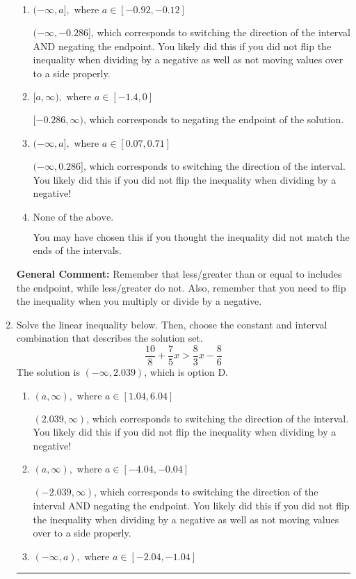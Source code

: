 \documentclass{extbook}[14pt]
\newcommand{\litem}[1]{\item #1

\rule{\textwidth}{0.4pt}}
\begin{document}
\begin{enumerate}
{\begin{enumerate}[label=\Alph*.]
* $[0.286, \infty)$, which is the correct option.
\item \( (-\infty, a], \text{ where } a \in [-0.92, -0.12] \)

 $(-\infty, -0.286]$, which corresponds to switching the direction of the interval AND negating the endpoint. You likely did this if you did not flip the inequality when dividing by a negative as well as not moving values over to a side properly.
\item \( [a, \infty), \text{ where } a \in [-1.4, 0] \)

 $[-0.286, \infty)$, which corresponds to negating the endpoint of the solution.
\item \( (-\infty, a], \text{ where } a \in [0.07, 0.71] \)

 $(-\infty, 0.286]$, which corresponds to switching the direction of the interval. You likely did this if you did not flip the inequality when dividing by a negative!
\item \( \text{None of the above}. \)

You may have chosen this if you thought the inequality did not match the ends of the intervals.
\end{enumerate}

\textbf{General Comment:} Remember that less/greater than or equal to includes the endpoint, while less/greater do not. Also, remember that you need to flip the inequality when you multiply or divide by a negative.
}
\litem{
Solve the linear inequality below. Then, choose the constant and interval combination that describes the solution set.
\[ \frac{10}{8} + \frac{7}{5} x > \frac{8}{3} x - \frac{8}{6} \]
The solution is \( (-\infty, 2.039) \), which is option D.\begin{enumerate}[label=\Alph*.]
\item \( (a, \infty), \text{ where } a \in [1.04, 6.04] \)

 $(2.039, \infty)$, which corresponds to switching the direction of the interval. You likely did this if you did not flip the inequality when dividing by a negative!
\item \( (a, \infty), \text{ where } a \in [-4.04, -0.04] \)

 $(-2.039, \infty)$, which corresponds to switching the direction of the interval AND negating the endpoint. You likely did this if you did not flip the inequality when dividing by a negative as well as not moving values over to a side properly.
\item \( (-\infty, a), \text{ where } a \in [-2.04, -1.04] \)


\end{enumerate}}
\end{enumerate}
\end{document}
